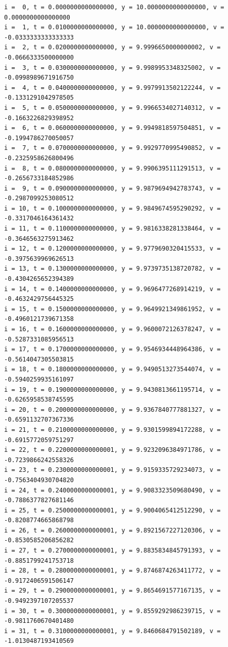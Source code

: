 \documentclass[a4j,titlepage]{jsarticle}
\begin{document}
\begin{lstlisting}[style=text,caption=課題8の実行結果,label=lst:kekka8]
i =  0, t = 0.0000000000000000, y = 10.0000000000000000, v = 0.0000000000000000
i =  1, t = 0.0100000000000000, y = 10.0000000000000000, v = -0.0333333333333333
i =  2, t = 0.0200000000000000, y = 9.9996650000000002, v = -0.0666333500000000
i =  3, t = 0.0300000000000000, y = 9.9989953348325002, v = -0.0998989671916750
i =  4, t = 0.0400000000000000, y = 9.9979913502122244, v = -0.1331291042978505
i =  5, t = 0.0500000000000000, y = 9.9966534027140312, v = -0.1663226829398952
i =  6, t = 0.0600000000000000, y = 9.9949818597504851, v = -0.1994786270050057
i =  7, t = 0.0700000000000000, y = 9.9929770995490852, v = -0.2325958626800496
i =  8, t = 0.0800000000000000, y = 9.9906395111291513, v = -0.2656733184852986
i =  9, t = 0.0900000000000000, y = 9.9879694942783743, v = -0.2987099253080512
i = 10, t = 0.1000000000000000, y = 9.9849674595290292, v = -0.3317046164361432
i = 11, t = 0.1100000000000000, y = 9.9816338281338464, v = -0.3646563275913462
i = 12, t = 0.1200000000000000, y = 9.9779690320415533, v = -0.3975639969626513
i = 13, t = 0.1300000000000000, y = 9.9739735138720782, v = -0.4304265652394389
i = 14, t = 0.1400000000000000, y = 9.9696477268914219, v = -0.4632429756445325
i = 15, t = 0.1500000000000000, y = 9.9649921349861952, v = -0.4960121739671358
i = 16, t = 0.1600000000000000, y = 9.9600072126378247, v = -0.5287331085956513
i = 17, t = 0.1700000000000000, y = 9.9546934448964386, v = -0.5614047305503815
i = 18, t = 0.1800000000000000, y = 9.9490513273544074, v = -0.5940259935161097
i = 19, t = 0.1900000000000000, y = 9.9430813661195714, v = -0.6265958538745595
i = 20, t = 0.2000000000000000, y = 9.9367840777881327, v = -0.6591132707367336
i = 21, t = 0.2100000000000000, y = 9.9301599894172288, v = -0.6915772059751297
i = 22, t = 0.2200000000000001, y = 9.9232096384971786, v = -0.7239866242558326
i = 23, t = 0.2300000000000001, y = 9.9159335729234073, v = -0.7563404930704820
i = 24, t = 0.2400000000000001, y = 9.9083323509680490, v = -0.7886377827681146
i = 25, t = 0.2500000000000001, y = 9.9004065412512290, v = -0.8208774665868798
i = 26, t = 0.2600000000000001, y = 9.8921567227120306, v = -0.8530585206856282
i = 27, t = 0.2700000000000001, y = 9.8835834845791393, v = -0.8851799241753718
i = 28, t = 0.2800000000000001, y = 9.8746874263411772, v = -0.9172406591506147
i = 29, t = 0.2900000000000001, y = 9.8654691577167135, v = -0.9492397107205537
i = 30, t = 0.3000000000000001, y = 9.8559292986239715, v = -0.9811760670401480
i = 31, t = 0.3100000000000001, y = 9.8460684791502189, v = -1.0130487193410569

\end{lstlisting}
\end{document}
